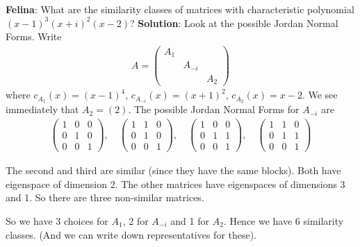 \documentclass{article}
\theoremstyle{definition} \newtheorem*{definition}{Definition}
\begin{document}
\textbf{Felina}: What are the similarity classes of matrices with characteristic
polynomial $(x-1)^3(x+i)^2(x-2)$?
\textbf{Solution}: Look at the possible Jordan Normal Forms. Write
\begin{align*}
  A = \left( 
  \begin{matrix}
    A_1 &&\\
    &A_{-i}&\\
    &&A_2
  \end{matrix}
  \right)
\end{align*}
where $c_{A_1}(x) = (x-1)^4$, $c_{A_{-i}}(x)=(x+1)^2$, $c_{A_2}(x)=x-2$.
We see immediately that $A_2=(2)$. The possible Jordan Normal Forms for
$A_{-i}$ are
\begin{align*}
  \left( 
  \begin{matrix}
    1 & 0 & 0 \\
    0 & 1 & 0 \\
    0 & 0 & 1
  \end{matrix}
  \right), \quad\left( 
  \begin{matrix}
    1 & 1 & 0\\
    0 & 1 & 0\\
    0 & 0 & 1
  \end{matrix}
  \right),\quad\left( 
  \begin{matrix}
    1 & 0 & 0\\
    0 & 1 & 1\\
    0 & 0 & 1
  \end{matrix}
  \right),\quad\left( 
  \begin{matrix}
    1 & 1 & 0\\
    0 & 1 & 1\\
    0 & 0 & 1
  \end{matrix}
  \right)
\end{align*}

The second and third are similar (since they have the same blocks).
Both have eigenspace of dimension 2. The other matrices have 
eigenspaces of dimensions 3 and 1. So there are three non-similar 
matrices. 

So we have 3 choices for $A_1$, 2 for $A_{-i}$ and 1 for $A_2$. Hence
we have 6 similarity classes. (And we can write down representatives for
these).
\end{document}
